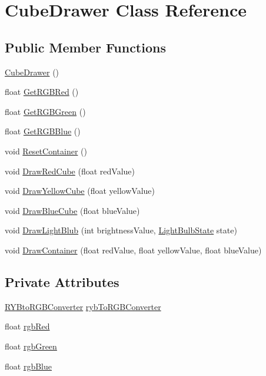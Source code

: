 \hypertarget{class_cube_drawer}{\section{Cube\+Drawer Class Reference}
\label{class_cube_drawer}
}
\subsection*{Public Member Functions}
\begin{DoxyCompactItemize}
\item 
\hyperlink{class_cube_drawer_a3b1168fa71224f19164367296c93d335}{Cube\+Drawer} ()
\item 
float \hyperlink{class_cube_drawer_a84ccbaf912cfdb235e345e21f41fc2ce}{Get\+R\+G\+B\+Red} ()
\item 
float \hyperlink{class_cube_drawer_ac60f7e6c9ff0fa65e6e560e6a2f343ab}{Get\+R\+G\+B\+Green} ()
\item 
float \hyperlink{class_cube_drawer_aaface2a1a6a992578bc639acab0bb5e0}{Get\+R\+G\+B\+Blue} ()
\item 
void \hyperlink{class_cube_drawer_a98924c1ba8f84c022628379cbe98c649}{Reset\+Container} ()
\item 
void \hyperlink{class_cube_drawer_a7da44d9557e804997a7335c9e26c7d3c}{Draw\+Red\+Cube} (float red\+Value)
\item 
void \hyperlink{class_cube_drawer_ab6bc069ecabe5173725c17bcc47ba23e}{Draw\+Yellow\+Cube} (float yellow\+Value)
\item 
void \hyperlink{class_cube_drawer_af79912c422160746bba73bac117883b4}{Draw\+Blue\+Cube} (float blue\+Value)
\item 
void \hyperlink{class_cube_drawer_a05e6fd33e056d85f4d58d6e452a90f3a}{Draw\+Light\+Blub} (int brightness\+Value, \hyperlink{_configuration_8cpp_a4f6a51e216a42669e538078745cbd8bb}{Light\+Bulb\+State} state)
\item 
void \hyperlink{class_cube_drawer_a6b2babde183b97ebbdb249b342c62559}{Draw\+Container} (float red\+Value, float yellow\+Value, float blue\+Value)
\end{DoxyCompactItemize}
\subsection*{Private Attributes}
\begin{DoxyCompactItemize}
\item 
\hyperlink{class_r_y_bto_r_g_b_converter}{R\+Y\+Bto\+R\+G\+B\+Converter} \hyperlink{class_cube_drawer_ab9483b262b62ff540e3464b17f2a57d1}{ryb\+To\+R\+G\+B\+Converter}
\item 
float \hyperlink{class_cube_drawer_a5f960475b30e9508076bde88e591c470}{rgb\+Red}
\item 
float \hyperlink{class_cube_drawer_a9d0faded7b1cea3fd2ffdc37074826d0}{rgb\+Green}
\item 
float \hyperlink{class_cube_drawer_ab72d63224a9a847b174bf645b9c21da6}{rgb\+Blue}
\end{DoxyCompactItemize}


